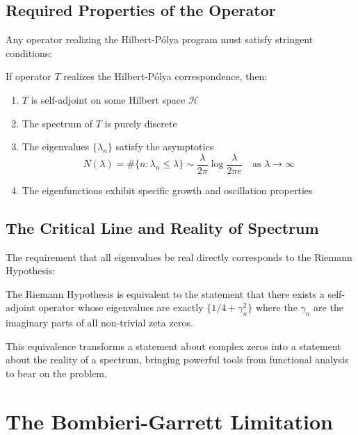 \subsection{Required Properties of the Operator}

Any operator realizing the Hilbert-Pólya program must satisfy stringent conditions:

\begin{theorem}
\label{thm:necessary_conditions}
If operator $T$ realizes the Hilbert-Pólya correspondence, then:
\begin{enumerate}
\item $T$ is self-adjoint on some Hilbert space $\mathcal{H}$
\item The spectrum of $T$ is purely discrete
\item The eigenvalues $\{\lambda_n\}$ satisfy the asymptotics
$$N(\lambda) = \#\{n : \lambda_n \leq \lambda\} \sim \frac{\lambda}{2\pi}\log\frac{\lambda}{2\pi e} \quad \text{as } \lambda \to \infty$$
\item The eigenfunctions exhibit specific growth and oscillation properties
\end{enumerate}
\end{theorem}

\subsection{The Critical Line and Reality of Spectrum}

The requirement that all eigenvalues be real directly corresponds to the Riemann Hypothesis:

\begin{proposition}[RH Equivalence]
\label{prop:rh_equivalence}
The Riemann Hypothesis is equivalent to the statement that there exists a self-adjoint operator whose eigenvalues are exactly $\{1/4 + \gamma_n^2\}$ where the $\gamma_n$ are the imaginary parts of all non-trivial zeta zeros.
\end{proposition}

This equivalence transforms a statement about complex zeros into a statement about the reality of a spectrum, bringing powerful tools from functional analysis to bear on the problem.

\section{The Bombieri-Garrett Limitation}
\label{sec:bombieri_garrett}

